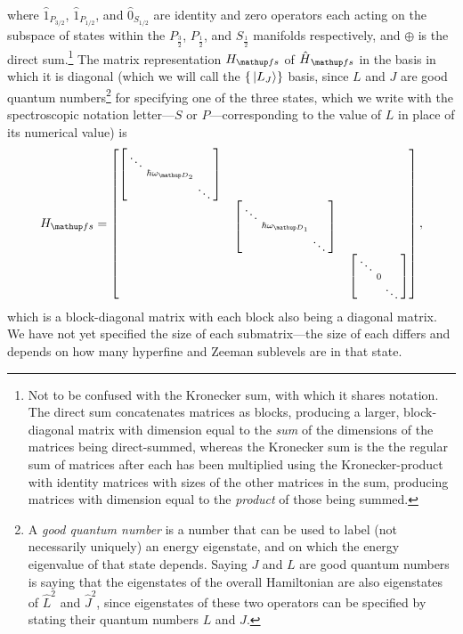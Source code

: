 where $\hat1_{P_{3/2}}$, $\hat1_{P_{1/2}}$, and $\hat 0_{S_{1/2}}$ are identity and zero operators each acting on the subspace of states within the $P_{\frac32}$, $P_{\frac12}$, and $S_{\frac12}$ manifolds respectively, and $\oplus$ is the direct sum.\footnote{Not to be confused with the Kronecker sum, with which it shares notation. The direct sum concatenates matrices as blocks, producing a larger, block-diagonal matrix with dimension equal to the \emph{sum} of the dimensions of the matrices being direct-summed, whereas the Kronecker sum is the the regular sum of matrices after each has been multiplied using the Kronecker-product with identity matrices with sizes of the other matrices in the sum, producing matrices with dimension equal to the \emph{product} of those being summed.} The matrix representation $H_\up{fs}$ of $\hat H_\up{fs}$ in the basis in which it is diagonal (which we will call the $\{\ket{L_J}\}$ basis, since $L$ and $J$ are good quantum numbers\footnote{A \emph{good quantum number} is a number that can be used to label (not necessarily uniquely) an energy eigenstate, and on which the energy eigenvalue of that state depends. Saying $J$ and $L$ are good quantum numbers is saying that the eigenstates of the overall Hamiltonian are also eigenstates of $\hat L^2$ and $\hat J^2$, since eigenstates of these two operators can be specified by stating their quantum numbers $L$ and $J$.} for specifying one of the three states, which we write with the spectroscopic notation letter---$S$ or $P$---corresponding to the value of $L$ in place of its numerical value) is
\begin{align}
H_\up{fs}  = 
\left[\begin{matrix}
    \left[\begin{smallmatrix}\ddots &&\\&\hbar\omega_{\up{D}_2}&\\&&\ddots\\\end{smallmatrix} \right]\\
    & \left[\begin{smallmatrix}\ddots &&\\&\hbar\omega_{\up{D}_1}&\\&&\ddots\\\end{smallmatrix} \right]\\
    & &\left[\begin{smallmatrix}\ddots &&\\&0&\\&&\ddots\\\end{smallmatrix} \right]
\end{matrix} \right],
\end{align}
which is a block-diagonal matrix with each block also being a diagonal matrix. We have not yet specified the size of each submatrix---the size of each differs and depends on how many hyperfine and Zeeman sublevels are in that state.

